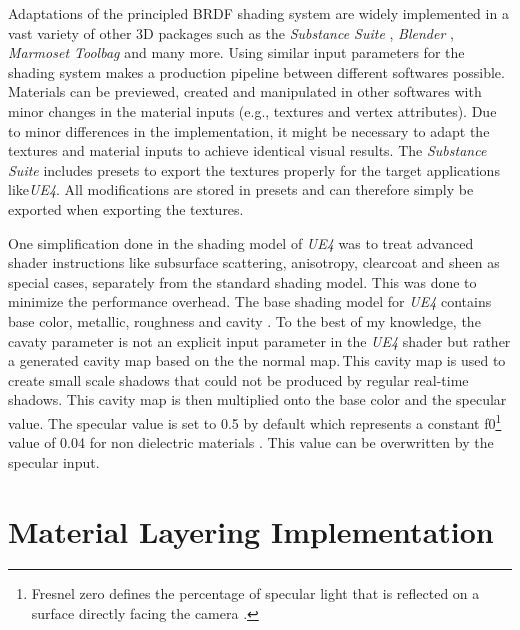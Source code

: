 Adaptations of the principled BRDF shading system are widely implemented in a vast variety of other 3D packages such as the \emph{Substance Suite} \cite[p.\,8]{wes2018comprehensivevol1}, \emph{Blender} \cite{blender2017bsdf}, \emph{Marmoset Toolbag} and many more. Using similar input parameters for the shading system makes a production pipeline between different softwares possible. Materials can be previewed, created and manipulated in other softwares with minor changes in the material inputs (e.g., textures and vertex attributes). Due to minor differences in the implementation, it might be necessary to adapt the textures and material inputs to achieve identical visual results. The \emph{Substance Suite} includes presets to export the textures properly for the target applications like\emph{UE4}. All modifications are stored in presets and can therefore simply be exported when exporting the textures.        

One simplification done in the shading model of \emph{UE4} was to treat advanced shader instructions like subsurface scattering, anisotropy, clearcoat and sheen as special cases, separately from the standard shading model. This was done to minimize the performance overhead. The base shading model for \emph{UE4} contains base color, metallic, roughness and cavity \cite[p.\,9--10]{karis2013real}. To the best of my knowledge, the cavaty parameter is not an explicit input parameter in the \emph{UE4} shader but rather a generated cavity map based on the the normal map.\,This cavity map is used to create small scale shadows that could not be produced by regular real-time shadows. This cavity map is then multiplied onto the base color and the specular value. The specular value is set to 0.5 by default which represents a constant f0\footnote{Fresnel zero defines the percentage of specular light that is reflected on a surface directly facing the camera \cite[p.\,10]{wes2018comprehensivevol1}.} value of 0.04 for non dielectric materials \cite{epic2018physicalMaterial}. This value can be overwritten by the specular input.    

	
\section{Material Layering Implementation}\label{sec:patternLayeringInUEUnity}

